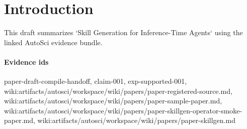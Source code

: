\section{Introduction}
This draft summarizes `Skill Generation for Inference-Time Agents` using the linked AutoSci evidence bundle.

\paragraph{Evidence ids} paper-draft-compile-handoff, claim-001, exp-supported-001, wiki:artifacts/autosci/workspace/wiki/papers/paper-registered-source.md, wiki:artifacts/autosci/workspace/wiki/papers/paper-sample-paper.md, wiki:artifacts/autosci/workspace/wiki/papers/paper-skillgen-operator-smoke-paper.md, wiki:artifacts/autosci/workspace/wiki/papers/paper-skillgen.md
